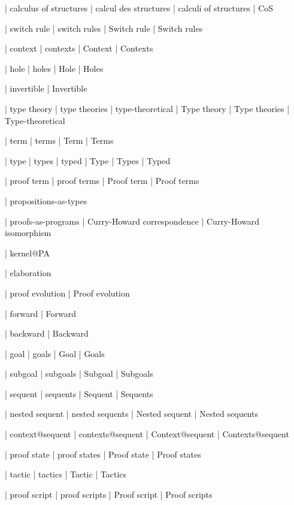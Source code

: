  | calculus of structures
 | calcul des structures
 | calculi of structures
 | CoS
 
 | switch rule
 | switch rules
 | Switch rule
 | Switch rules
 
 | context
 | contexts
 | Context
 | Contexts

 | hole
 | holes
 | Hole
 | Holes

 | invertible
 | Invertible

 | type theory
 | type theories
 | type-theoretical
 | Type theory
 | Type theories
 | Type-theoretical

 | term
 | terms
 | Term
 | Terms

 | type
 | types
 | typed
 | Type
 | Types
 | Typed

 | proof term
 | proof terms
 | Proof term
 | Proof terms

 | propositions-as-types

 | proofs-as-programs
 | Curry-Howard correspondence
 | Curry-Howard isomorphism

 | kernel@PA

 | elaboration

 | proof evolution
 | Proof evolution

 | forward
 | Forward

 | backward
 | Backward
 
 | goal
 | goals
 | Goal
 | Goals

 | subgoal
 | subgoals
 | Subgoal
 | Subgoals

 | sequent
 | sequents
 | Sequent
 | Sequents

 | nested sequent
 | nested sequents
 | Nested sequent
 | Nested sequents

 | context@sequent
 | contexts@sequent
 | Context@sequent
 | Contexts@sequent

 | proof state
 | proof states
 | Proof state
 | Proof states

 | tactic
 | tactics
 | Tactic
 | Tactics

 | proof script
 | proof scripts
 | Proof script
 | Proof scripts

